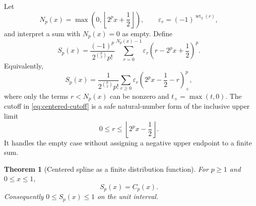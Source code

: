 \documentclass[11pt,oneside]{article}
\newtheorem{theorem}{Theorem}[section]
\theoremstyle{definition}
\theoremstyle{remark}
\newcommand{\wt}{\operatorname{wt}_2}
\begin{document}
Let
\begin{equation}
 N_p(x)=\max\left(0,\left\lfloor 2^p x+\frac12\right\rfloor\right),
 \qquad \varepsilon_r=(-1)^{\wt(r)},                       \label{eq:centered-cutoff}
\end{equation}
and interpret a sum with $N_p(x)=0$ as empty.  Define
\begin{equation}
 S_p(x)=
 \frac{(-1)^p}{2^{\binom p2}p!}
 \sum_{r=0}^{N_p(x)-1}
 \varepsilon_r
 \left(r-2^p x+\frac12\right)^p.                          \label{eq:centered-spline}
\end{equation}
Equivalently,
\begin{equation}
 S_p(x)=
 \frac{1}{2^{\binom p2}p!}
 \sum_{r\ge0}\varepsilon_r
 \left(2^p x-\frac12-r\right)_+^p,                        \label{eq:centered-spline-positive}
\end{equation}
where only the terms $r<N_p(x)$ can be nonzero and $t_+=\max(t,0)$.
The cutoff in \eqref{eq:centered-cutoff} is a safe natural-number form of the
inclusive upper limit
\[
 0\le r\le\left\lfloor2^p x-\frac12\right\rfloor.
\]
It handles the empty case without assigning a negative upper endpoint to a finite sum.

\begin{theorem}[Centered spline as a finite distribution function]
\label{thm:centered-spline-cdf}
For $p\ge1$ and $0\le x\le1$,
\begin{equation}
 S_p(x)=C_p(x).                                            \label{eq:spline-equals-cdf}
\end{equation}
Consequently $0\le S_p(x)\le1$ on the unit interval.
\end{theorem}
\end{document}
